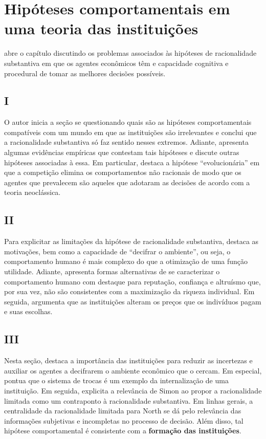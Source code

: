 \section{Hipóteses comportamentais em uma teoria das instituições}

\autor abre o capítulo discutindo os problemas associados às hipóteses de racionalidade substantiva em que os agentes econômicos têm e capacidade cognitiva e procedural de tomar as melhores decisões possíveis.

\subsection{I}

O autor inicia a seção se questionando quais são as hipóteses comportamentais compatíveis com um mundo em que as instituições são irrelevantes e conclui que a racionalidade substantiva só faz sentido nesses extremos. Adiante, apresenta algumas evidências empíricas que contestam tais hipóteses e discute outras hipóteses associadas à essa. Em particular, destaca a hipótese ``evolucionária'' em que a competição elimina os comportamentos não racionais de modo que os agentes que prevalecem são aqueles que adotaram as decisões de acordo com a teoria neoclássica.

\subsection{II}

Para explicitar as limitações da hipótese de racionalidade substantiva, \autor destaca as motivações, bem como a capacidade de ``decifrar o ambiente'', ou seja, o comportamento humano é mais complexo do que a otimização de uma função utilidade. Adiante, apresenta formas alternativas de se caracterizar o comportamento humano com destaque para reputação, confiança e altruísmo que, por sua vez, não são consistentes com a maximização da riqueza individual. Em seguida, argumenta que as instituições alteram os preços que os indivíduos pagam e suas escolhas.

\subsection{III}

Nesta seção, \autor destaca a importância das instituições para reduzir as incertezas e auxiliar os agentes a decifrarem o ambiente econômico que o cercam. Em especial, pontua que o sistema de trocas é um exemplo da internalização de uma instituição. Em seguida, explicita a relevância de Simon ao propor a racionalidade limitada como um contraponto à racionalidade substantiva. Em linhas gerais, a centralidade da racionalidade limitada para North se dá pelo relevância das informações subjetivas e incompletas no processo de decisão. Além disso, tal hipótese comportamental é consistente com a \textbf{formação das instituições}.

